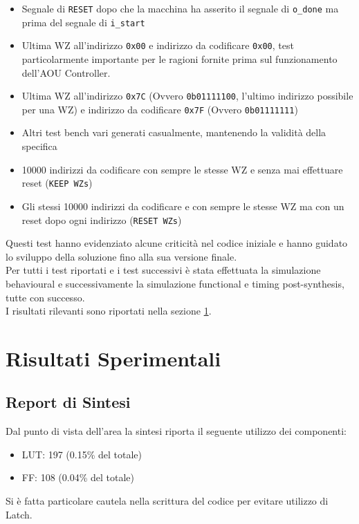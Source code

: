 \documentclass{article}
\begin{document}
\begin{itemize}
\item Segnale di \texttt{RESET} dopo che la macchina ha asserito il segnale di \texttt{o\_done} ma prima del segnale di \texttt{i\_start}
\item Ultima WZ all'indirizzo \texttt{0x00} e indirizzo da codificare \texttt{0x00}, test particolarmente importante per le ragioni fornite prima sul funzionamento dell'AOU Controller.
\item Ultima WZ all'indirizzo \texttt{0x7C} (Ovvero \texttt{0b01111100}, l'ultimo indirizzo possibile per una WZ) e indirizzo da codificare \texttt{0x7F} (Ovvero \texttt{0b01111111})
\item Altri test bench vari generati casualmente, mantenendo la validità della specifica
\item 10000 indirizzi da codificare con sempre le stesse WZ e senza mai effettuare reset (\texttt{KEEP WZs})
\item Gli stessi 10000 indirizzi da codificare e con sempre le stesse WZ ma con un reset dopo ogni indirizzo (\texttt{RESET WZs})
\end{itemize}

Questi test hanno evidenziato alcune criticità nel codice iniziale e hanno guidato lo sviluppo della soluzione fino alla sua versione finale.\\

Per tutti i test riportati e i test successivi è stata effettuata la simulazione behavioural e successivamente la simulazione functional e timing post-synthesis, tutte con successo.\\

I risultati rilevanti sono riportati nella sezione \ref{risultati}.

\section{Risultati Sperimentali}
\label{risultati}

\subsection{Report di Sintesi}

Dal punto di vista dell'area la sintesi riporta il seguente utilizzo dei componenti:
\begin{itemize}
\item LUT: 197 (0.15\% del totale)
\item FF: 108 (0.04\% del totale)
\end{itemize}
Si è fatta particolare cautela nella scrittura del codice per evitare utilizzo di Latch.
\end{document}
